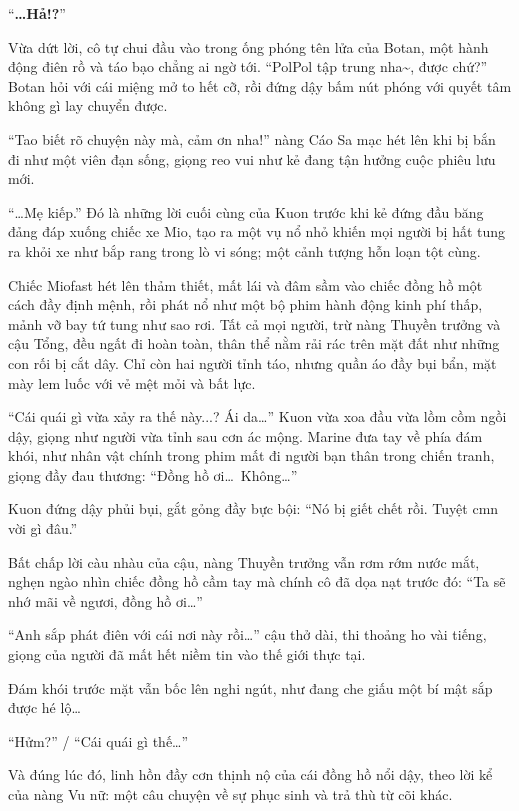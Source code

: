 \documentclass[../main.tex]{subfiles}
\begin{document}
``\textbf{\dots Hả!?}''

Vừa dứt lời, cô tự chui đầu vào trong ống phóng tên lửa của Botan, một hành động điên rồ và táo bạo chẳng ai ngờ tới. ``PolPol tập trung nha\~{}, được chứ?'' Botan hỏi với cái miệng mở to hết cỡ, rồi đứng dậy bấm nút phóng với quyết tâm không gì lay chuyển được.


``Tao biết rõ chuyện này mà, cảm ơn nha!'' nàng Cáo Sa mạc hét lên khi bị bắn đi như một viên đạn sống, giọng reo vui như kẻ đang tận hưởng cuộc phiêu lưu mới.

``\dots Mẹ kiếp.'' Đó là những lời cuối cùng của Kuon trước khi kẻ đứng đầu băng đảng đáp xuống chiếc xe Mio, tạo ra một vụ nổ nhỏ khiến mọi người bị hất tung ra khỏi xe như bắp rang trong lò vi sóng; một cảnh tượng hỗn loạn tột cùng.

Chiếc Miofast hét lên thảm thiết, mất lái và đâm sầm vào chiếc đồng hồ một cách đầy định mệnh, rồi phát nổ như một bộ phim hành động kinh phí thấp, mảnh vỡ bay tứ tung như sao rơi. Tất cả mọi người, trừ nàng Thuyền trưởng và cậu Tổng, đều ngất đi hoàn toàn, thân thể nằm rải rác trên mặt đất như những con rối bị cắt dây. Chỉ còn hai người tỉnh táo, nhưng quần áo đầy bụi bẩn, mặt mày lem luốc với vẻ mệt mỏi và bất lực.

``Cái quái gì vừa xảy ra thế này...? Ái da\dots'' Kuon vừa xoa đầu vừa lồm cồm ngồi dậy, giọng như người vừa tỉnh sau cơn ác mộng. Marine đưa tay về phía đám khói, như nhân vật chính trong phim mất đi người bạn thân trong chiến tranh, giọng đầy đau thương: ``Đồng hồ ơi\dots\ Không\dots''

Kuon đứng dậy phủi bụi, gắt gỏng đầy bực bội: ``Nó bị giết chết rồi. Tuyệt cmn vời gì đâu.''

Bất chấp lời càu nhàu của cậu, nàng Thuyền trưởng vẫn rơm rớm nước mắt, nghẹn ngào nhìn chiếc đồng hồ cầm tay mà chính cô đã dọa nạt trước đó: ``Ta sẽ nhớ mãi về ngươi, đồng hồ ơi\dots''

``Anh sắp phát điên với cái nơi này rồi\dots'' cậu thở dài, thi thoảng ho vài tiếng, giọng của người đã mất hết niềm tin vào thế giới thực tại.

Đám khói trước mặt vẫn bốc lên nghi ngút, như đang che giấu một bí mật sắp được hé lộ\dots

``Hửm?'' / ``Cái quái gì thế\dots''

Và đúng lúc đó, linh hồn đầy cơn thịnh nộ của cái đồng hồ nổi dậy, theo lời kể của nàng Vu nữ: một câu chuyện về sự phục sinh và trả thù từ cõi khác.
\end{document}
